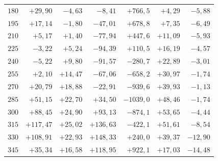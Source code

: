 \begin{center}
\begin{tabular}{r|r|r|r|r|r|r}
\(180\) & \(+29{,}90\) & \(-4{,}63\) & \(-8{,}41\) & \(+766{,}5\) & \(+4{,}29\) & \(-5{,}88\) \\
\(195\) & \(+17{,}14\) & \(-1{,}80\) & \(-47{,}01\) & \(+678{,}8\) & \(+7{,}35\) & \(-6{,}49\) \\
\(210\) & \(+5{,}17\) & \(+1{,}40\) & \(-77{,}94\) & \(+447{,}6\) & \(+11{,}09\) & \(-5{,}93\) \\
\(225\) & \(-3{,}22\) & \(+5{,}24\) & \(-94{,}39\) & \(+110{,}5\) & \(+16{,}19\) & \(-4{,}57\) \\[3pt]
\(240\) & \(-5{,}22\) & \(+9{,}80\) & \(-91{,}57\) & \(-280{,}7\) & \(+22{,}89\) & \(-3{,}01\) \\
\(255\) & \(+2{,}10\) & \(+14{,}47\) & \(-67{,}06\) & \(-658{,}2\) & \(+30{,}97\) & \(-1{,}74\) \\
\(270\) & \(+20{,}79\) & \(+18{,}88\) & \(-22{,}91\) & \(-939{,}6\) & \(+39{,}93\) & \(-1{,}13\) \\
\(285\) & \(+51{,}15\) & \(+22{,}70\) & \(+34{,}50\) & \(-1039{,}0\) & \(+48{,}46\) & \(-1{,}74\) \\[3pt]
\(300\) & \(+88{,}45\) & \(+24{,}90\) & \(+93{,}13\) & \(-874{,}1\) & \(+53{,}65\) & \(-4{,}44\) \\
\(315\) & \(+117{,}47\) & \(+25{,}02\) & \(+136{,}63\) & \(-422{,}1\) & \(+51{,}61\) & \(-8{,}54\) \\
\(330\) & \(+108{,}91\) & \(+22{,}93\) & \(+148{,}33\) & \(+240{,}0\) & \(+39{,}37\) & \(-12{,}90\) \\
\(345\) & \(+35{,}34\) & \(+16{,}58\) & \(+118{,}95\) & \(+922{,}1\) & \(+17{,}03\) & \(-14{,}48\) \\
\end{tabular}
\end{center}
\endgroup
